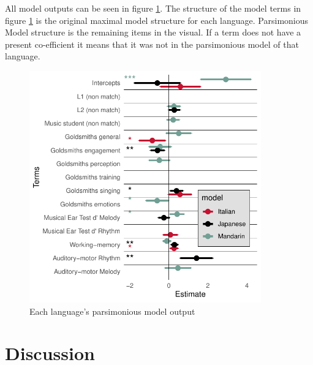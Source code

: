 \documentclass[a4paper]{article}
\begin{document}
All model outputs can be seen in figure \ref{fig:model}. The structure of the model terms in figure \ref{fig:model} is the original maximal model structure for each language. Parsimonious Model structure is the remaining items in the visual. If a term does not have a present co-efficient it means that it was not in the parsimonious model of that language.

\begin{figure}[T]
  \centering
  \includegraphics[width=\linewidth,height=10cm]{SP_24_visuals/Japanese,Italian,_Mandarin_max_models_structure:_parsimonious_effects.pdf}
  \caption{Each language's parsimonious model output}
  \label{fig:model}
\end{figure}

\section{Discussion}
\end{document}
